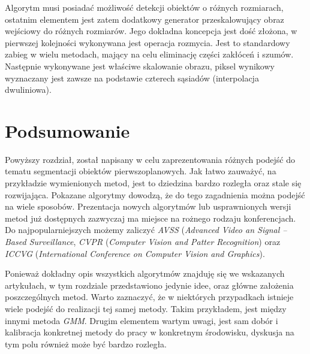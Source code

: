 Algorytm musi posiadać możliwość detekcji obiektów o różnych rozmiarach, ostatnim elementem jest zatem dodatkowy generator przeskalowujący obraz wejściowy do różnych rozmiarów. Jego dokładna koncepcja jest dość złożona, w pierwszej kolejności wykonywana jest operacja rozmycia. Jest to standardowy zabieg w wielu metodach, mający na celu eliminację części zakłóceń i szumów. Następnie wykonywane jest właściwe skalowanie obrazu, piksel wynikowy wyznaczany jest zawsze na podstawie czterech sąsiadów (interpolacja dwuliniowa). 


\section{Podsumowanie}
\label{sec:przeglad_podsumowanie}

Powyższy rozdział, został napisany w celu zaprezentowania różnych podejść do tematu segmentacji obiektów pierwszoplanowych. 
Jak łatwo zauważyć, na przykładzie wymienionych metod, jest to dziedzina bardzo rozległa oraz stale się rozwijająca. 
Pokazane algorytmy dowodzą, że do tego zagadnienia można podejść na wiele sposobów. 
Prezentacja nowych algorytmów lub usprawnionych wersji metod już dostępnych zazwyczaj ma miejsce na rożnego rodzaju konferencjach. 
Do najpopularniejszych możemy zaliczyć \textit{AVSS} (\textit{Advanced Video an Signal -- Based Surveillance}, \textit{CVPR} (\textit{Computer Vision and Patter Recognition}) oraz \textit{ICCVG} (\textit{International Conference on Computer Vision and Graphics}).


Ponieważ dokładny opis wszystkich algorytmów znajduję się we wskazanych artykułach, w tym rozdziale przedstawiono jedynie idee, oraz główne założenia poszczególnych metod. 
Warto zaznaczyć, że w niektórych przypadkach istnieje wiele podejść do realizacji tej samej metody. 
Takim przykładem, jest między innymi metoda \textit{GMM}. 
Drugim elementem wartym uwagi, jest sam dobór i kalibracja konkretnej metody do pracy w konkretnym środowisku, dyskusja na tym polu również może być bardzo rozległa. 